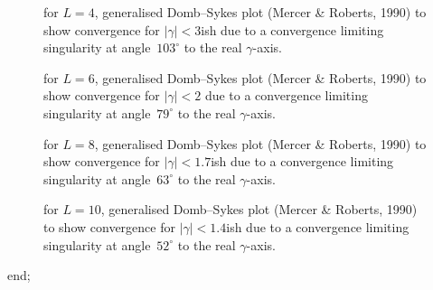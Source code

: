 \documentclass[11pt,a5paper]{article}
\begin{document}
\begin{figure}
\centering
\caption{\label{fig:tiwdbcDS}%
for \(L=4\), generalised Domb--Sykes plot (Mercer \& Roberts, 1990) to show convergence for \(|\gamma|<3\)ish due to a convergence limiting singularity at angle~\(103^\circ\) to the real \(\gamma\)-axis.}

\end{figure}


\begin{figure}
\centering
\caption{\label{fig:tiwdbcDS}%
for \(L=6\), generalised Domb--Sykes plot (Mercer \& Roberts, 1990) to show convergence for \(|\gamma|<2\) due to a convergence limiting singularity at angle~\(79^\circ\) to the real \(\gamma\)-axis.}

\end{figure}

\begin{figure}
\centering
\caption{\label{fig:tiwdbcDS}%
for \(L=8\), generalised Domb--Sykes plot (Mercer \& Roberts, 1990) to show convergence for \(|\gamma|<1.7\)ish due to a convergence limiting singularity at angle~\(63^\circ\) to the real \(\gamma\)-axis.}

\end{figure}




\begin{figure}
\centering
\caption{\label{fig:tiwdbcDS}%
for \(L=10\), generalised Domb--Sykes plot (Mercer \& Roberts, 1990) to show convergence for \(|\gamma|<1.4\)ish due to a convergence limiting singularity at angle~\(52^\circ\) to the real \(\gamma\)-axis.}

\end{figure}




\begin{reduce}
end;
\end{reduce}
\end{document}
